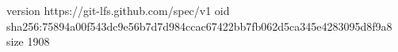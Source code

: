 version https://git-lfs.github.com/spec/v1
oid sha256:75894a00f543dc9e56b7d7d984ccac67422bb7fb062d5ca345e4283095d8f9a8
size 1908
